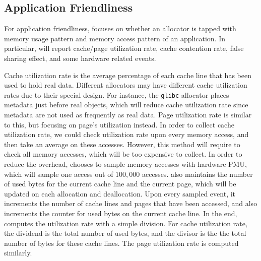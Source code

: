\subsection{Application Friendliness}
\label{sec:profilefriendliness}

 
For application friendliness, \MP{} focuses on whether an allocator is tapped with memory usage pattern and memory access pattern of an application.  In particular, \MP{} will report cache/page utilization rate, cache contention rate, false sharing effect, and some hardware related events. 


Cache utilization rate is the average percentage of each cache line that has been used to hold real data. Different allocators may have different cache utilization rates due to their special design. For instance, the \texttt{glibc} allocator places metadata just before real objects, which will reduce cache utilization rate since metadata are not used as frequently as real data. Page utilization rate is similar to this, but focusing on page's utilization instead. In order to collect cache utilization rate, we could check utilization rate upon every memory access, and then take an average on these accesses. However, this method will require to check all memory accesses, which will be too expensive to collect. In order to reduce the overhead, \MP{} chooses to sample memory accesses with hardware PMU, which will sample one access out of $100,000$ accesses. \MP{} also maintains the number of used bytes for the current cache line and the current page, which will be updated on each allocation and deallocation. Upon every sampled event, it increments the number of cache lines and pages that have been accessed, and also increments the counter for used bytes on the current cache line. In the end, \MP{} computes the utilization rate with a simple division. For cache utilization rate, the dividend is the total number of used bytes, and the divisor is the the total number of bytes for these cache lines. The page utilization rate is computed similarly.

